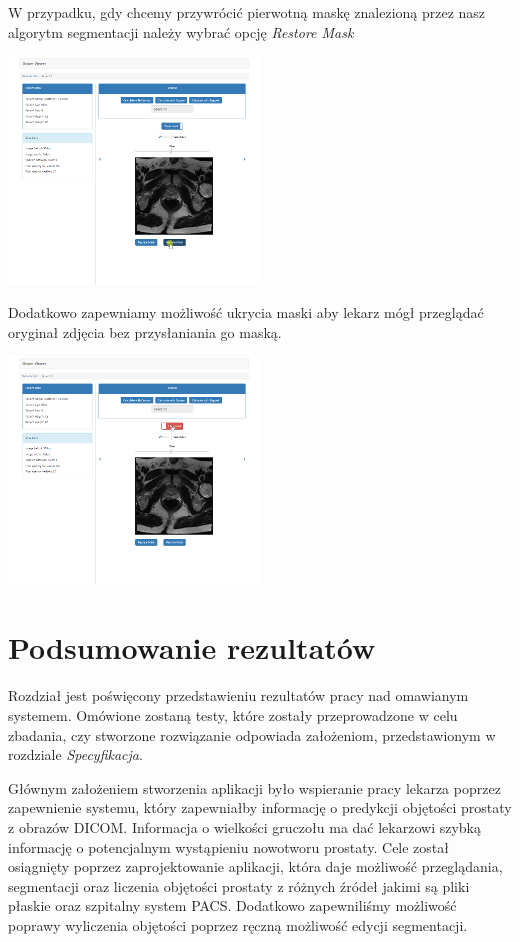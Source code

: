 \documentclass[a4paper,11pt,twoside]{report}
\theoremstyle{definition}
\begin{document}
W przypadku, gdy chcemy przywrócić pierwotną maskę znalezioną przez nasz algorytm segmentacji należy wybrać opcję \textit{Restore Mask}

\begin{minipage}[h]{\linewidth}
	\centering
	\includegraphics[width=0.5\textwidth]{FrontScreen/Editing/323.png}
\end{minipage}

Dodatkowo zapewniamy możliwość ukrycia maski aby lekarz mógł przeglądać oryginał zdjęcia bez przysłaniania go maską.

\begin{minipage}[h]{\linewidth}
	\centering
	\includegraphics[width=0.5\textwidth]{FrontScreen/Editing/366.png}
\end{minipage}





\chapter{Podsumowanie rezultatów}
Rozdział jest poświęcony przedstawieniu rezultatów pracy nad omawianym systemem. Omówione zostaną testy, które zostały przeprowadzone w celu zbadania, czy stworzone rozwiązanie odpowiada założeniom, przedstawionym w rozdziale \textit{Specyfikacja}. 
\par
Głównym założeniem stworzenia aplikacji było wspieranie pracy lekarza poprzez zapewnienie systemu, który zapewniałby informację o predykcji objętości prostaty z obrazów DICOM. Informacja o wielkości gruczołu ma dać lekarzowi szybką informację o potencjalnym wystąpieniu nowotworu prostaty. Cele został osiągnięty poprzez zaprojektowanie aplikacji, która daje możliwość przeglądania, segmentacji oraz liczenia objętości prostaty z różnych źródeł jakimi są pliki płaskie oraz szpitalny system PACS. Dodatkowo zapewniliśmy możliwość poprawy wyliczenia objętości poprzez ręczną możliwość edycji segmentacji. 
\end{document}
